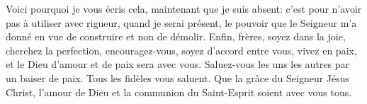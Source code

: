 Voici pourquoi je vous écris cela, maintenant que je suis absent:
	c’est pour n’avoir pas à utiliser avec rigueur, quand je serai présent,
	le pouvoir que le Seigneur m’a donné en vue de construire et non de démolir.
Enfin, frères, soyez dans la joie,
	cherchez la perfection, encouragez-vous,
	soyez d’accord entre vous, vivez en paix,
	et le Dieu d’amour et de paix sera avec vous.
Saluez-vous les uns les autres par un baiser de paix.
	Tous les fidèles vous saluent.
Que la grâce du Seigneur Jésus Christ,
	l’amour de Dieu et la communion du Saint-Esprit soient avec vous tous.
